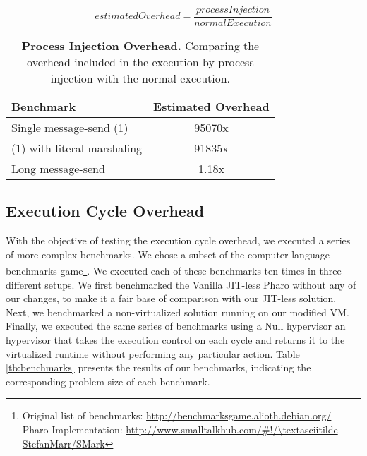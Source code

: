 \begin{equation*}
estimatedOverhead = \frac{processInjection}{normalExecution}
\end{equation*}

\begin{table}[ht]
 	\centering
 	\begin{tabular}{lc}
			\toprule
			\textbf{Benchmark}
 			& \textbf{Estimated Overhead}\\
		\midrule
		Single message-send (1) & 95070x \\\midrule
		(1) with literal marshaling & 91835x \\\midrule
		Long message-send & 1.18x  \\\midrule
 	\end{tabular}
	\vspace*{0.2cm}
 	\caption{\textbf{Process Injection Overhead.} Comparing the overhead included in the execution by process injection with the normal execution.\label{tb:benchmarks_injection_comparison}}
 \end{table}

\subsection{Execution Cycle Overhead}
With the objective of testing the execution cycle overhead, we executed a series of more complex benchmarks. We chose a subset of the computer language benchmarks game\footnote{Original list of benchmarks: \url{http://benchmarksgame.alioth.debian.org/}\\Pharo Implementation: \url{http://www.smalltalkhub.com/\#!/\textasciitilde StefanMarr/SMark}}. We executed each of these benchmarks ten times in three different setups. We first benchmarked the Vanilla JIT-less Pharo \VM without any of our changes, to make it a fair base of comparison with our JIT-less solution. Next, we benchmarked a non-virtualized solution running on our modified VM. Finally, we executed the same series of benchmarks using a Null hypervisor \ie an hypervisor that takes the execution control on each cycle and returns it to the virtualized runtime without performing any particular action. Table \ref{tb:benchmarks} presents the results of our benchmarks, indicating the corresponding problem size of each benchmark.



